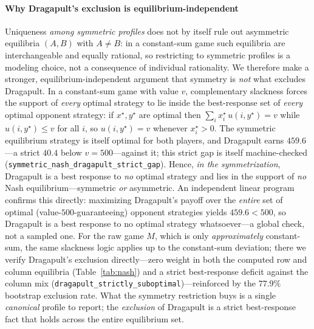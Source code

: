 \documentclass[journal]{IEEEtran}
\newif\ifhighlightchanges
\newcommand{\revised}[1]{\ifhighlightchanges\textcolor{blue!70!black}{#1}\else#1\fi}
\begin{document}
\paragraph{\revised{Why Dragapult's exclusion is equilibrium-independent}}
\revised{Uniqueness \emph{among symmetric profiles} does not by itself rule out asymmetric equilibria $(A,B)$ with $A\neq B$: in a constant-sum game such equilibria are interchangeable and equally rational, so restricting to symmetric profiles is a modeling choice, not a consequence of individual rationality.
We therefore make a stronger, equilibrium-independent argument that symmetry is \emph{not} what excludes Dragapult.
In a constant-sum game with value $v$, complementary slackness forces the support of \emph{every} optimal strategy to lie inside the best-response set of \emph{every} optimal opponent strategy: if $x^\star,y^\star$ are optimal then $\sum_i x^\star_i\,u(i,y^\star)=v$ while $u(i,y^\star)\le v$ for all $i$, so $u(i,y^\star)=v$ whenever $x^\star_i>0$.
The symmetric equilibrium strategy is itself optimal for both players, and Dragapult earns $459.6$\textperthousand{}---a strict $40.4$\textperthousand{} below $v=500$---against it; this strict gap is itself machine-checked (\texttt{symmetric\_nash\_dragapult\_strict\_gap}).
Hence, \emph{in the symmetrization}, Dragapult is a best response to \emph{no} optimal strategy and lies in the support of \emph{no} Nash equilibrium---symmetric \emph{or} asymmetric.
An independent linear program confirms this directly: maximizing Dragapult's payoff over the \emph{entire} set of optimal (value-$500$-guaranteeing) opponent strategies yields $459.6$\textperthousand{}$<500$, so Dragapult is a best response to no optimal strategy whatsoever---a global check, not a sampled one.
For the raw game $M$, which is only \emph{approximately} constant-sum, the same slackness logic applies up to the constant-sum deviation; there we verify Dragapult's exclusion directly---zero weight in both the computed row and column equilibria (Table~\ref{tab:nash}) and a strict best-response deficit against the column mix (\texttt{dragapult\_strictly\_suboptimal})---reinforced by the $77.9\%$ bootstrap exclusion rate.
What the symmetry restriction buys is a single \emph{canonical} profile to report; the \emph{exclusion} of Dragapult is a strict best-response fact that holds across the entire equilibrium set.}
\end{document}
